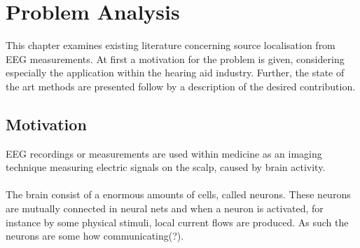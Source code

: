 \chapter{Problem Analysis}
This chapter examines existing literature concerning source localisation from EEG measurements. At first a motivation for the problem is given, considering especially the application within the hearing aid industry. Further, the state of the art methods are presented follow by a description of the desired contribution. 

\section{Motivation}
EEG recordings or measurements are used within medicine as an imaging technique measuring electric signals on the scalp, caused by brain activity. \\
\\
The brain consist of a enormous amounts of cells, called neurons. These neurons are mutually connected in neural nets and when a neuron is activated, for instance by some physical stimuli, local current flows are produced\cite{fundamentalEEG}. As such the neurons are some how communicating(?). \\
\\
